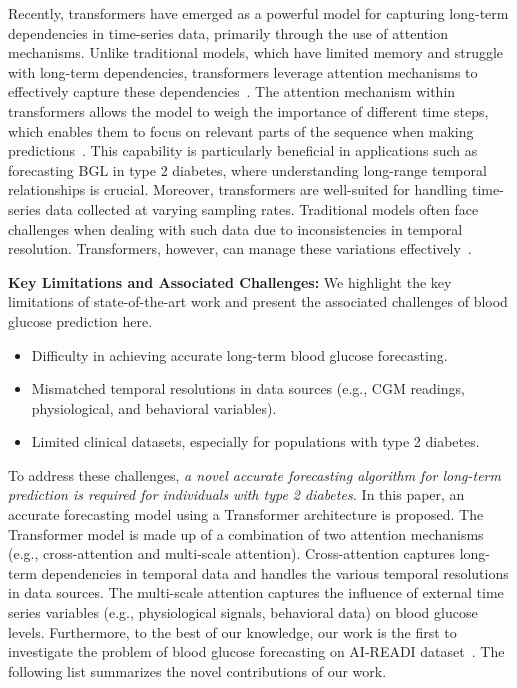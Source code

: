 Recently, transformers have emerged as a powerful model for capturing long-term dependencies in time-series data, primarily through the use of attention mechanisms. Unlike traditional models, which have limited memory and struggle with long-term dependencies, transformers leverage attention mechanisms to effectively capture these dependencies~\cite{kong2024unlocking}.  The attention mechanism within transformers allows the model to weigh the importance of different time steps, which enables them to focus on relevant parts of the sequence when making predictions~\cite{vaswani2017attention}. This capability is particularly beneficial in applications such as forecasting BGL in type 2 diabetes, where understanding long-range temporal relationships is crucial. Moreover, transformers are well-suited for handling time-series data collected at varying sampling rates. Traditional models often face challenges when dealing with such data due to inconsistencies in temporal resolution. Transformers, however, can manage these variations effectively~\cite{chen2024pathformer, zhang2024multi}.

\textbf{Key Limitations and Associated Challenges:} We highlight the key limitations of state-of-the-art work and present the associated challenges of blood glucose prediction here.
\begin{itemize}
    \item Difficulty in achieving accurate long-term blood glucose forecasting.
    \item Mismatched temporal resolutions in data sources (e.g., CGM readings, physiological, and behavioral variables).
    \item Limited clinical datasets, especially for populations with type 2 diabetes.

\end{itemize}

To address these challenges, \textit{a novel accurate forecasting algorithm for long-term prediction is required for individuals with type 2 diabetes.} In this paper, an accurate forecasting model using a Transformer architecture is proposed. The Transformer model is made up of a combination of two attention mechanisms (e.g., cross-attention and multi-scale attention). Cross-attention captures long-term dependencies in temporal data and handles the various temporal resolutions in data sources.  The multi-scale attention captures the influence of external time series variables (e.g., physiological signals, behavioral data) on blood glucose levels. Furthermore, to the best of our knowledge, our work is the first to investigate the problem of blood glucose forecasting on AI-READI dataset~\cite{AIREADI2024,AIREADI20242}. The following list summarizes the novel contributions of our work.


